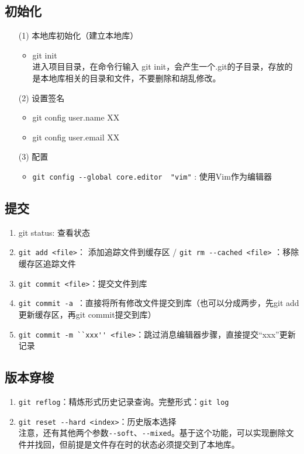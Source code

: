 \subsection{初始化}
\begin{itemize}
\item[(1)] 本地库初始化（建立本地库）
\begin{itemize}
\item git init\\
进入项目目录，在命令行输入 git init，会产生一个.git的子目录，存放的是本地库相关的目录和文件，不要删除和胡乱修改。
\end{itemize}

\item[(2)] 设置签名
\begin{itemize}
\item git config user.name XX
\item git config user.email XX
\end{itemize}

\item [(3)] 配置
\begin{itemize}
\item \verb|git config --global core.editor  "vim"| : 使用Vim作为编辑器
\end{itemize}

\end{itemize}



\subsection{提交}
\begin{enumerate}
\item git status: 查看状态
\item \verb|git add <file>|： 添加追踪文件到缓存区 / \verb|git rm --cached <file>| ：移除缓存区追踪文件
\item \verb|git commit <file>|：提交文件到库
\item \verb|git commit -a |：直接将所有修改文件提交到库（也可以分成两步，先git add更新缓存区，再git commit提交到库）
\item \verb|git commit -m ``xxx'' <file>|：跳过消息编辑器步骤，直接提交“xxx”更新记录
\end{enumerate}



\subsection{版本穿梭}
\begin{enumerate}
\item \verb|git reflog|：精炼形式历史记录查询。完整形式：\verb|git log| 

\item \verb|git reset --hard <index>|：历史版本选择\\
注意，还有其他两个参数\verb|--soft|、\verb|--mixed|。基于这个功能，可以实现删除文件并找回，但前提是文件存在时的状态必须提交到了本地库。
\end{enumerate}



